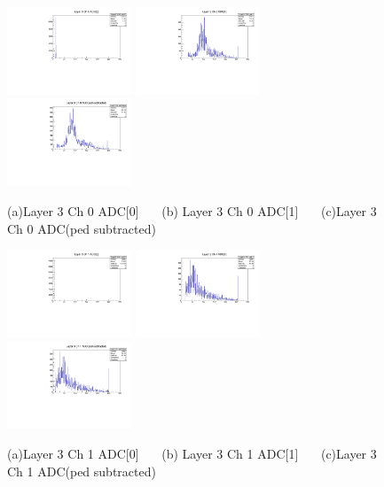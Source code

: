 \documentclass[a4paper,11pt]{article}
\theoremstyle{mytheor}
\begin{document}
\begin{figure}[H] 
\vspace*{-0.3cm} 
\includegraphics[width=0.33\textwidth,scale=0.5,trim=0 0 0 0,clip]{plotsdir/file0_muons-Layer3_Ch0_adc0-1.pdf} 
\includegraphics[width=0.33\textwidth,scale=0.5,trim=0 0 0 0,clip]{plotsdir/file0_muons-Layer3_Ch0_adc1-1.pdf} 
\includegraphics[width=0.33\textwidth,scale=0.5,trim=0 0 0 0,clip]{plotsdir/file0_muons-Layer3_Ch0_adcPedsub-1.pdf} 
\caption{(a)Layer 3 Ch 0 ADC[0] ~~~(b) Layer 3 Ch 0 ADC[1] ~~~(c)Layer 3 Ch 0 ADC(ped subtracted) } 
\end{figure} 
\begin{figure}[H] 
\vspace*{-0.3cm} 
\includegraphics[width=0.33\textwidth,scale=0.5,trim=0 0 0 0,clip]{plotsdir/file0_muons-Layer3_Ch1_adc0-1.pdf} 
\includegraphics[width=0.33\textwidth,scale=0.5,trim=0 0 0 0,clip]{plotsdir/file0_muons-Layer3_Ch1_adc1-1.pdf} 
\includegraphics[width=0.33\textwidth,scale=0.5,trim=0 0 0 0,clip]{plotsdir/file0_muons-Layer3_Ch1_adcPedsub-1.pdf} 
\caption{(a)Layer 3 Ch 1 ADC[0] ~~~(b) Layer 3 Ch 1 ADC[1] ~~~(c)Layer 3 Ch 1 ADC(ped subtracted) } 
\end{figure} 
\end{document}
